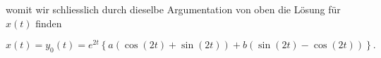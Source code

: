 womit wir schliesslich durch dieselbe Argumentation von oben die Lösung für \( x(t) \) finden

\begin{equation*}
    x(t) = y_0(t) = e^{2t} \left\{ a ( \cos(2t) + \sin(2t) ) + b ( \sin(2t) - \cos(2t) ) \right\}.
\end{equation*}